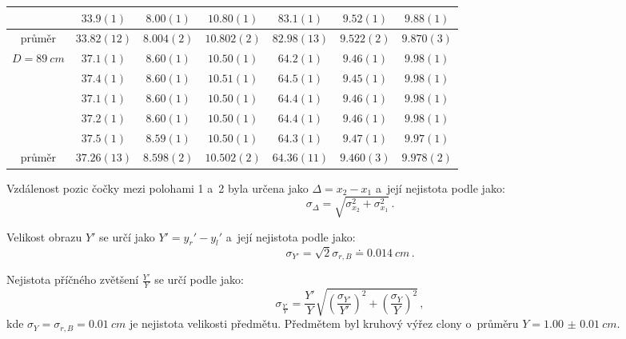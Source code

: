 \documentclass{../concepts/titul_zprava_p/prepareprotokolZprava} %
\newcommand{\relative}[1]{
\frac{\sigma_{#1}}{#1}
}
\newcommand{\squared}[1]{
\left( #1 \right)^2
}
\newcommand{\relsqr}[1]{
\squared{\relative{#1}}
}
\begin{document}
\begin{table}[!htbp]
\begin{tabular}{c|ccc|ccc}
  & $33.9(1)$ & $8.00(1)$ & $10.80(1)$ & $83.1(1)$ & $9.52(1)$ & $9.88(1)$ \\
  \midrule
  průměr & $33.82(12)$ & $8.004(2)$ & $10.802(2)$ & $82.98(13)$ & $9.522(2)$ & $9.870(3)$ \\
    \midrule
    \midrule
  \multirow{5}{*}{$D=\qty{89}{cm}$}& $37.1(1)$ & $8.60(1)$ & $10.50(1)$ & $64.2(1)$ & $9.46(1)$ & $9.98(1)$ \\
  & $37.4(1)$ & $8.60(1)$ & $10.51(1)$ & $64.5(1)$ & $9.45(1)$ & $9.98(1)$ \\
  & $37.1(1)$ & $8.60(1)$ & $10.50(1)$ & $64.4(1)$ & $9.46(1)$ & $9.98(1)$ \\
  & $37.2(1)$ & $8.60(1)$ & $10.50(1)$ & $64.4(1)$ & $9.46(1)$ & $9.98(1)$ \\
  & $37.5(1)$ & $8.59(1)$ & $10.50(1)$ & $64.3(1)$ & $9.47(1)$ & $9.97(1)$ \\
  \midrule
  průměr & $37.26(13)$ & $8.598(2)$ & $10.502(2)$ & $64.36(11)$ & $9.460(3)$ & $9.978(2)$ \\
 \bottomrule
\end{tabular}
\label{tab:raw_data}
\end{table}

Vzdálenost pozic čočky mezi polohami 1 a~2 byla určena jako $\Delta = x_2 - x_1$ a~její nejistota podle \cite{englich} jako:
\begin{equation}
    \label{eq:sigma_delta}
    \sigma_{\Delta} = \sqrt{\sigma_{x_2}^2 + \sigma_{x_1}^2} \,.
\end{equation}

Velikost obrazu $Y'$ se určí jako $Y' = y_r' - y_l'$ a~její nejistota podle \cite{englich} jako:
\begin{equation}
    \label{eq:sigma_Y}
    \sigma_{Y'} = \sqrt{2} \sigma_{r,B} \doteq \qty{0.014}{cm} \,.
\end{equation}

Nejistota příčného zvětšení $\frac{Y'}{Y}$ se určí podle \cite{englich} jako:
\begin{equation}
    \label{eq:sigma_YkuY}
    \sigma_{\frac{Y'}{Y}} = \frac{Y'}{Y} \sqrt{\relsqr{Y'} + \relsqr{Y}} \,,
\end{equation}
kde $\sigma_Y = \sigma_{r,B} = \qty{0.01}{cm}$ je nejistota velikosti předmětu. Předmětem byl kruhový výřez clony 
o~průměru $Y = \qty{1.00(1)}{cm}$.
\end{document}

